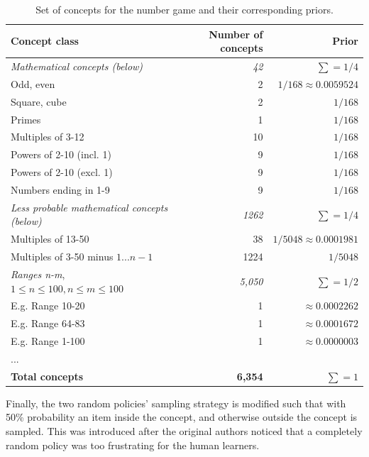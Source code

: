 \begin{table}
\centering
\small
\begin{tabular}{l|r|r}
    \hline
    \textbf{Concept class}  & \textbf{Number of concepts} & \textbf{Prior} \\
    \hline
    \textit{Mathematical concepts (below)} & \textit{42} & $\sum = 1/4$ \\
    \hline
    Odd, even               & 2     & $1/168 \approx 0.0059524$ \\
    Square, cube            & 2     & $1/168$ \\
    Primes                  & 1     & $1/168$ \\
    Multiples of 3-12       & 10    & $1/168$ \\
    Powers of 2-10 (incl. 1)& 9     & $1/168$ \\
    Powers of 2-10 (excl. 1)& 9     & $1/168$ \\
    Numbers ending in 1-9   & 9     & $1/168$ \\
    \hline\hline
    \textit{Less probable mathematical concepts (below)} & \textit{1262} & $\sum = 1/4$ \\
    \hline
    Multiples of 13-50        & 38 & $1/5048 \approx 0.0001981$ \\
    Multiples of 3-50 minus $1...n-1$ & 1224 & $1/5048$ \\
    \hline\hline
    \textit{Ranges n-m}, $1 \leq n \leq 100, n \leq m \leq 100$ & \textit{5,050} & $\sum = 1/2$ \\
    \hline
    E.g. Range 10-20        & 1 & $\approx0.0002262$ \\
    E.g. Range 64-83        & 1 & $\approx0.0001672$ \\
    E.g. Range 1-100        & 1 & $\approx0.0000003$ \\
    ... & &                     \\
    \hline\hline
    \textbf{Total concepts} & \textbf{6,354} & $\sum = 1$ \\
    \hline
\end{tabular}
\caption{Set of concepts for the number game and their corresponding priors.}
\label{tab:ng-concepts}
\end{table}

Finally, the two random policies' sampling strategy is modified such that with 50\% probability an item inside the concept, and otherwise outside the concept is sampled.
This was introduced after the original authors noticed that a completely random policy was too frustrating for the human learners.

